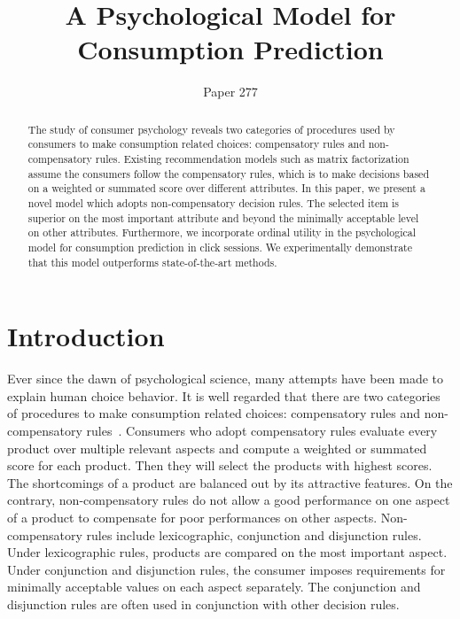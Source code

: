 \documentclass[sigconf]{acmart}
\begin{document}
\title{A Psychological Model for Consumption Prediction}


\author{Paper 277}


\begin{abstract}
The study of consumer psychology reveals two categories of procedures used by consumers to make consumption related choices: compensatory rules and non-compensatory rules. Existing recommendation models such as matrix factorization assume the consumers follow the compensatory rules, which is to make decisions based on a weighted or summated score over different attributes. In this paper, we present a novel model which adopts non-compensatory decision rules. The selected item is superior on the most important attribute and beyond the minimally acceptable level on other attributes. Furthermore, we incorporate ordinal utility in the psychological model for consumption prediction in click sessions. We experimentally demonstrate that this model outperforms state-of-the-art methods.
\end{abstract}




\maketitle
\section{Introduction}\label{sec:introduction}


Ever since the dawn of psychological science, many attempts have been made to explain human choice behavior. It is well regarded that there are two categories of procedures to make consumption related choices: compensatory rules and non-compensatory rules~\cite{Engel1986Consumer}. Consumers who adopt compensatory rules evaluate every product over multiple relevant aspects and compute a weighted or summated score for each product. Then they will select the products with highest scores. The shortcomings of a product are balanced out by its attractive features. On the contrary, non-compensatory rules do not allow a good performance on one aspect of a product to compensate for poor performances on other aspects. Non-compensatory rules include lexicographic, conjunction and disjunction rules. Under lexicographic rules, products are compared on the most important aspect. Under conjunction and disjunction rules, the consumer imposes requirements for minimally acceptable values on each aspect separately. The conjunction and disjunction rules are often used in conjunction with other decision rules.
\end{document}
